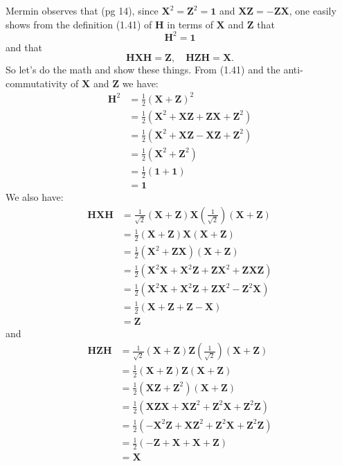 \documentclass{article}
\begin{document}
Mermin observes that (pg 14), since $\bm{X}^2 = \bm{Z}^2 = \bm{1}$ and $\bm{X}\bm{Z} = -\bm{Z}\bm{X}$, one easily shows from the definition (1.41) of $\bm{H}$ in terms of $\bm{X}$ and $\bm{Z}$ that
\[\tag{1.42}
\bm{H}^2 = \bm{1}
\]
and that
\[\tag{1.43}
\bm{H}\bm{X}\bm{H} = \bm{Z},\quad\bm{H}\bm{Z}\bm{H} = \bm{X}.
\]
So let's do the math and show these things. From (1.41) and the anti-commutativity of $\bm{X}$ and $\bm{Z}$ we have:
\begin{align*}
    \bm{H}^2
    &= \frac{1}{2}(\bm{X} + \bm{Z})^2\\
    &= \frac{1}{2}(\bm{X}^2 + \bm{X}\bm{Z} + \bm{Z}\bm{X} +  \bm{Z}^2)\\
    &= \frac{1}{2}(\bm{X}^2 + \bm{X}\bm{Z} - \bm{X}\bm{Z} +  \bm{Z}^2)\\
    &= \frac{1}{2}(\bm{X}^2 + \bm{Z}^2)\\
    &= \frac{1}{2}(\bm{1} + \bm{1})\\
    &= \bm{1}
\end{align*}
We also have:
\begin{align*}
    \bm{H}\bm{X}\bm{H}
    &= \frac{1}{\sqrt{2}}(\bm{X} + \bm{Z})\bm{X}(\frac{1}{\sqrt{2}})(\bm{X} + \bm{Z})\\
    &= \frac{1}{2}(\bm{X} + \bm{Z})\bm{X}(\bm{X} + \bm{Z})\\
    &= \frac{1}{2}(\bm{X}^2 + \bm{Z}\bm{X})(\bm{X} + \bm{Z})\\
    &= \frac{1}{2}(\bm{X}^2\bm{X} + \bm{X}^2\bm{Z} + \bm{Z}\bm{X}^2 + \bm{Z}\bm{X}\bm{Z})\\
    &= \frac{1}{2}(\bm{X}^2\bm{X} + \bm{X}^2\bm{Z} + \bm{Z}\bm{X}^2 - \bm{Z}^2\bm{X})\\
    &= \frac{1}{2}(\bm{X} + \bm{Z} + \bm{Z} - \bm{X})\\
    &= \bm{Z}
\end{align*}
and
\begin{align*}
    \bm{H}\bm{Z}\bm{H}
    &= \frac{1}{\sqrt{2}}(\bm{X} + \bm{Z})\bm{Z}(\frac{1}{\sqrt{2}})(\bm{X} + \bm{Z})\\
    &= \frac{1}{2}(\bm{X} + \bm{Z})\bm{Z}(\bm{X} + \bm{Z})\\
    &= \frac{1}{2}(\bm{X}\bm{Z} + \bm{Z}^2)(\bm{X} + \bm{Z})\\
    &= \frac{1}{2}(\bm{X}\bm{Z}\bm{X} + \bm{X}\bm{Z}^2 + \bm{Z}^2\bm{X} + \bm{Z}^2\bm{Z})\\
    &= \frac{1}{2}(-\bm{X}^2\bm{Z} + \bm{X}\bm{Z}^2 + \bm{Z}^2\bm{X} + \bm{Z}^2\bm{Z})\\
    &= \frac{1}{2}(-\bm{Z} + \bm{X} + \bm{X} + \bm{Z})\\
    &= \bm{X}
\end{align*}



\printbibliography
\end{document}

